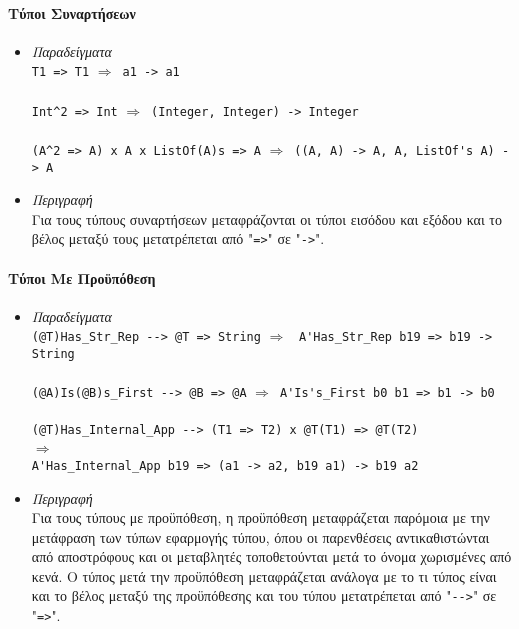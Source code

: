 \documentclass[diploma]{softlab-thesis}
\def\lra{$\Longrightarrow$\ }
\begin{document}
\newpage
\paragraph{Τύποι Συναρτήσεων}

\begin{itemize}
\item
\textit{Παραδείγματα}\\

\verb|T1 => T1| \lra \verb|a1 -> a1|\\\\
\verb|Int^2 => Int| \lra \verb|(Integer, Integer) -> Integer|\\\\
\verb|(A^2 => A) x A x ListOf(A)s => A|
\lra \verb|((A, A) -> A, A, ListOf's A) -> A|\\

\item
\textit{Περιγραφή}\\

Για τους τύπους συναρτήσεων μεταφράζονται οι τύποι εισόδου και εξόδου
και το βέλος μεταξύ τους μετατρέπεται από "\verb|=>|" σε "\verb|->|".

\end{itemize}

\paragraph{Τύποι Με Προϋπόθεση}

\begin{itemize}
\item
\textit{Παραδείγματα}\\

\verb|(@T)Has_Str_Rep --> @T => String|
\lra
\verb|A'Has_Str_Rep b19 => b19 -> String|\\\\
\verb|(@A)Is(@B)s_First --> @B => @A|
\lra \verb|A'Is's_First b0 b1 => b1 -> b0|\\\\
\verb|(@T)Has_Internal_App --> (T1 => T2) x @T(T1) => @T(T2)|
\\
\lra
\\
\verb|A'Has_Internal_App b19 => (a1 -> a2, b19 a1) -> b19 a2|\\

\item
\textit{Περιγραφή}\\

Για τους τύπους με προϋπόθεση, η προϋπόθεση μεταφράζεται παρόμοια με την
μετάφραση των τύπων εφαρμογής τύπου, όπου οι παρενθέσεις αντικαθιστώνται
από αποστρόφους και οι μεταβλητές τοποθετούνται μετά το όνομα χωρισμένες
από κενά. Ο τύπος μετά την προϋπόθεση μεταφράζεται ανάλογα με το τι τύπος είναι
και το βέλος μεταξύ της προϋπόθεσης και του τύπου μετατρέπεται από "\verb|-->|"
σε "\verb|=>|".

\end{itemize}
\end{document}
